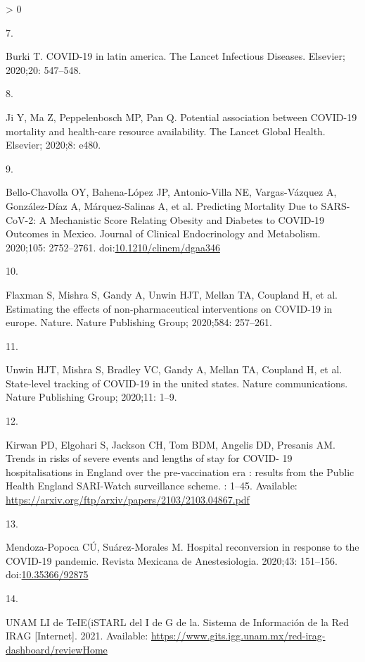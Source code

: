 \documentclass[10pt,letterpaper]{article}
\newlength{\csllabelwidth}
\newlength{\cslhangindent}
\newenvironment{CSLReferences}[3] %
 {%
  \setlength{\parindent}{0pt}
  \ifodd #1 \everypar{\setlength{\hangindent}{\cslhangindent}}\ignorespaces\fi
  \ifnum #2 > 0
  \setlength{\parskip}{#2\baselineskip}
  \fi
 }%
 {}
\newcommand{\CSLLeftMargin}[1]{\parbox[t]{\csllabelwidth}{#1}}
\newcommand{\CSLRightInline}[1]{\parbox[t]{\linewidth - \csllabelwidth}{#1}}
\begin{document}
\begin{CSLReferences}{0}{0}
\leavevmode\hypertarget{ref-burki2020covid}{}%
\CSLLeftMargin{7. }
\CSLRightInline{Burki T. COVID-19 in latin america. The Lancet
Infectious Diseases. Elsevier; 2020;20: 547--548. }

\leavevmode\hypertarget{ref-ji2020potential}{}%
\CSLLeftMargin{8. }
\CSLRightInline{Ji Y, Ma Z, Peppelenbosch MP, Pan Q. Potential
association between COVID-19 mortality and health-care resource
availability. The Lancet Global Health. Elsevier; 2020;8: e480. }

\leavevmode\hypertarget{ref-Bello-Chavolla2020}{}%
\CSLLeftMargin{9. }
\CSLRightInline{Bello-Chavolla OY, Bahena-López JP, Antonio-Villa NE,
Vargas-Vázquez A, González-Díaz A, Márquez-Salinas A, et al. {Predicting
Mortality Due to SARS-CoV-2: A Mechanistic Score Relating Obesity and
Diabetes to COVID-19 Outcomes in Mexico}. Journal of Clinical
Endocrinology and Metabolism. 2020;105: 2752--2761.
doi:\href{https://doi.org/10.1210/clinem/dgaa346}{10.1210/clinem/dgaa346}}

\leavevmode\hypertarget{ref-flaxman2020estimating}{}%
\CSLLeftMargin{10. }
\CSLRightInline{Flaxman S, Mishra S, Gandy A, Unwin HJT, Mellan TA,
Coupland H, et al. Estimating the effects of non-pharmaceutical
interventions on COVID-19 in europe. Nature. Nature Publishing Group;
2020;584: 257--261. }

\leavevmode\hypertarget{ref-unwin2020state}{}%
\CSLLeftMargin{11. }
\CSLRightInline{Unwin HJT, Mishra S, Bradley VC, Gandy A, Mellan TA,
Coupland H, et al. State-level tracking of COVID-19 in the united
states. Nature communications. Nature Publishing Group; 2020;11: 1--9. }

\leavevmode\hypertarget{ref-Kirwan}{}%
\CSLLeftMargin{12. }
\CSLRightInline{Kirwan PD, Elgohari S, Jackson CH, Tom BDM, Angelis DD,
Presanis AM. {Trends in risks of severe events and lengths of stay for
COVID- 19 hospitalisations in England over the pre-vaccination era :
results from the Public Health England SARI-Watch surveillance scheme}.
: 1--45. Available:
\url{https://arxiv.org/ftp/arxiv/papers/2103/2103.04867.pdf}}

\leavevmode\hypertarget{ref-Mendoza-Popoca2020}{}%
\CSLLeftMargin{13. }
\CSLRightInline{Mendoza-Popoca CÚ, Suárez-Morales M. {Hospital
reconversion in response to the COVID-19 pandemic}. Revista Mexicana de
Anestesiologia. 2020;43: 151--156.
doi:\href{https://doi.org/10.35366/92875}{10.35366/92875}}

\leavevmode\hypertarget{ref-UNAM2021}{}%
\CSLLeftMargin{14. }
\CSLRightInline{UNAM LI de TeIE(iSTARL del I de G de la. {Sistema de
Informaci{ó}n de la Red IRAG} {[}Internet{]}. 2021. Available:
\url{https://www.gits.igg.unam.mx/red-irag-dashboard/reviewHome}}


\end{CSLReferences}
\end{document}
